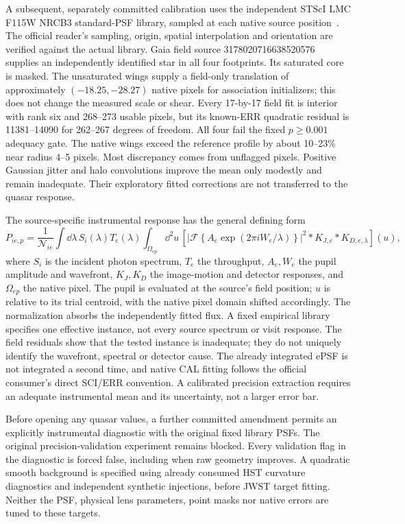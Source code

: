 A subsequent, separately committed calibration uses the independent
STScI LMC F115W NRCB3 standard-PSF library, sampled at each native source
position~\cite{JWSTSTDPSF,PhotutilsPSF}. The official reader's sampling, origin, spatial interpolation
and orientation are verified against the actual library. Gaia field
source 3178020716638520576 supplies an independently identified star in
all four footprints. Its saturated core is masked. The unsaturated wings
supply a field-only translation of approximately $(-18.25,-28.27)$ native
pixels for association initializers; this does not change the measured
scale or shear. Every 17-by-17 field fit is interior with rank six and
268--273 usable pixels, but its known-ERR quadratic residual is
11381--14090 for 262--267 degrees of freedom. All four fail the fixed
$p\geq0.001$ adequacy gate. The native wings exceed the reference profile
by about 10--23\% near radius 4--5 pixels. Most discrepancy comes from
unflagged pixels. Positive Gaussian jitter and halo convolutions improve
the mean only modestly and remain inadequate. Their exploratory fitted
corrections are not transferred to the quasar response.

The source-specific instrumental response has the general defining form
\begin{equation}
 P_{ie,p}=\frac{1}{\mathcal N_{ie}}
 \int\!\dd\lambda\,S_i(\lambda)T_e(\lambda)
 \int_{\Omega_{ep}}\!\dd^2u\,
 \left[\left|\mathcal F\!\left\{
 A_e\exp(2\pi i W_e/\lambda)\right\}\right|^2
       *K_{J,e}*K_{D,e,\lambda}\right](u),
 \label{eq:he0435-instrument-response}
\end{equation}
where $S_i$ is the incident photon spectrum, $T_e$ the throughput,
$A_e,W_e$ the pupil amplitude and wavefront, $K_J,K_D$ the image-motion
and detector responses, and $\Omega_{ep}$ the native pixel.
The pupil is evaluated at the source's field position; $u$ is relative
to its trial centroid, with the native pixel domain shifted accordingly.
The normalization absorbs the independently fitted flux. A fixed empirical
library specifies one effective instance, not every source spectrum or
visit response. The field residuals show that the tested instance is
inadequate; they do not uniquely identify the wavefront, spectral or
detector cause. The already integrated ePSF is not integrated a second
time, and native CAL fitting follows the official consumer's direct
SCI/ERR convention. A calibrated precision extraction requires an
adequate instrumental mean and its uncertainty, not a larger error bar.

Before opening any quasar values, a further committed amendment permits
an explicitly instrumental diagnostic with the original fixed library
PSFs. The original precision-validation experiment remains blocked.
Every validation flag in the diagnostic is forced false, including when
raw geometry improves. A quadratic smooth background is specified using
already consumed HST curvature diagnostics and independent synthetic
injections, before JWST target fitting. Neither the PSF, physical lens
parameters, point masks nor native errors are tuned to these targets.

